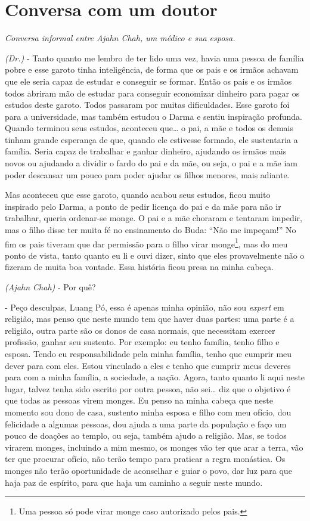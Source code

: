 
\chapter{Conversa com um doutor}

{\itshape
Conversa informal entre Ajahn Chah, um médico e sua esposa.}

\textit{(Dr.)} - Tanto quanto me lembro de ter lido uma vez, havia
uma pessoa de família pobre e esse garoto tinha inteligência, de forma
que os pais e os irmãos achavam que ele seria capaz de estudar e
conseguir se formar. Então os pais e os irmãos todos abriram mão de
estudar para conseguir economizar dinheiro para pagar os estudos deste
garoto. Todos passaram por muitas dificuldades. Esse garoto foi para a
universidade, mas também estudou o Darma e sentiu inspiração profunda.
Quando terminou seus estudos, aconteceu que… o pai, a mãe e todos os
demais tinham grande esperança de que, quando ele estivesse formado,
ele sustentaria a família. Seria capaz de trabalhar e ganhar dinheiro,
ajudando os irmãos mais novos ou ajudando a dividir o fardo do pai e da
mãe, ou seja, o pai e a mãe iam poder descansar um pouco para poder
ajudar os filhos menores, mais adiante. 

Mas aconteceu que esse garoto, quando acabou seus estudos, ficou
muito inspirado pelo Darma, a ponto de pedir licença do pai e da mãe
para não ir trabalhar, queria ordenar-se monge. O pai e a mãe choraram
e tentaram impedir, mas o filho disse ter muita fé no ensinamento do
Buda: “Não me impeçam!” No fim os pais tiveram que dar permissão para o
filho virar monge\footnote{Uma pessoa só pode virar monge caso
autorizado pelos pais.}, mas do meu ponto de vista, tanto quanto eu li
e ouvi dizer, sinto que eles provavelmente não o fizeram de muita boa
vontade. Essa história ficou presa na minha cabeça. 

\textit{(Ajahn Chah) }{}- Por quê? 

{}- Peço desculpas, Luang Pó, essa é apenas minha opinião, não sou
\textit{expert} em religião, mas penso que neste mundo tem que haver
duas partes: uma parte é a religião, outra parte são os donos de casa
normais, que necessitam exercer profissão, ganhar seu sustento. Por
exemplo: eu tenho família, tenho filho e esposa. Tendo eu
responsabilidade pela minha família, tenho que cumprir meu dever para
com eles. Estou vinculado a eles e tenho que cumprir meus deveres para
com a minha família, a sociedade, a nação. Agora, tanto quanto li aqui
neste lugar, talvez tenha sido escrito por outra pessoa, não sei… diz
que o objetivo é que todas as pessoas virem monges. Eu penso na minha
cabeça que neste momento sou dono de casa, sustento minha esposa e
filho com meu ofício, dou felicidade a algumas pessoas, dou ajuda a uma
parte da população e faço um pouco de doações ao templo, ou seja,
também ajudo a religião. Mas, se todos virarem monges, incluindo a mim
mesmo, os monges vão ter que arar a terra, vão ter que procurar ofício,
não terão tempo para praticar a regra monástica. Os monges não terão
oportunidade de aconselhar e guiar o povo, dar luz para que haja paz de
espírito, para que haja um caminho a seguir neste mundo. 

